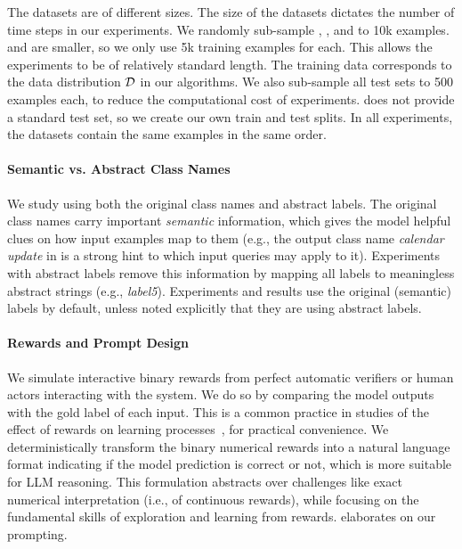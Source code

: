 The datasets are of different sizes. 
The size of the datasets dictates the number of time steps in our experiments.
We randomly sub-sample \banking, \clinic, and \nlu to 10k examples. 
\trec and \trecfine are smaller, so we only use 5k training examples for each. 
This allows the experiments to be of relatively standard length. 
The training data corresponds to the data distribution $\mathcal{D}$ in our algorithms.  
We also sub-sample all test sets to 500 examples each, to reduce the computational cost of experiments. 
\nlu does not provide a standard test set, so we create our own train and test splits. 
In all experiments, the datasets contain the same examples in the same order.

\paragraph{Semantic vs. Abstract Class Names}

We study using both the original class names and abstract labels. 
The original class names carry important \emph{semantic} information, which gives the model helpful clues on how input examples map to them (e.g., the output class name \textit{calendar update} in \clinic is a strong hint to which input queries may apply to it). 
Experiments with abstract labels remove this information by mapping all labels to meaningless abstract strings (e.g., \textit{label5}). 
Experiments and results use the original (semantic) labels by default, unless noted explicitly that they are using abstract labels. 







\paragraph{Rewards and Prompt Design}

We simulate interactive binary rewards from perfect automatic verifiers or human actors interacting with the system. We do so by comparing the model outputs with the gold label of each input. This is a common practice in studies of the effect of rewards on learning processes~\citep{10.5555/3618408.3618845,lightman2024lets}, for practical convenience. We deterministically transform the binary numerical rewards into a natural language format indicating if the model prediction is correct or not, which is more suitable for LLM reasoning. 
This formulation abstracts over challenges like exact numerical interpretation (i.e., of continuous rewards), while focusing on the fundamental skills of exploration and learning from rewards. 
 elaborates on our prompting.



